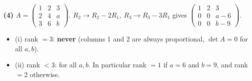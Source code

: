 \noindent\textbf{(4)} $A=\begin{pmatrix}1&2&3\\2&4&a\\3&6&b\end{pmatrix}$. $R_2\to R_2-2R_1,\ R_3\to R_3-3R_1$ gives $\begin{pmatrix}1&2&3\\0&0&a-6\\0&0&b-9\end{pmatrix}$.
\begin{itemize}\item (i) rank $=3$: \textbf{never} (columns 1 and 2 are always proportional, $\det A=0$ for all $a,b$).
\item (ii) rank $<3$: for all $a,b$. In particular rank $=1$ if $a=6$ and $b=9$, and rank $=2$ otherwise.\end{itemize}
